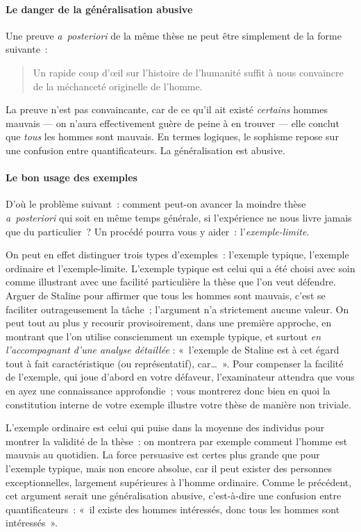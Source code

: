 \documentclass[a4paper]{article}
\begin{document}
\paragraph{Le danger de la généralisation abusive}
\label{sec-3-3-2-2}

Une preuve \emph{a posteriori} de la même thèse ne peut être simplement de la
forme suivante :

\begin{quote}
Un rapide coup d'œil sur l'histoire de l'humanité suffit à nous
convaincre de la méchanceté originelle de l'homme.
\end{quote}

La preuve n'est pas convaincante, car de ce qu'il ait existé
\emph{certains} hommes mauvais --- on n'aura effectivement guère de peine
à en trouver --- elle conclut que \emph{tous} les hommes sont mauvais. En
termes logiques, le sophisme repose sur une confusion entre
quantificateurs. La généralisation est abusive.

\paragraph{Le bon usage des exemples}
\label{sec-3-3-2-3}

D'où le problème suivant : comment peut-on avancer la moindre thèse
\emph{a posteriori} qui soit en même temps générale, si l'expérience ne
nous livre jamais que du particulier ? Un procédé pourra vous y
aider : l'\emph{exemple-limite}.

On peut en effet distinguer trois types d'exemples : l'exemple
typique, l'exemple ordinaire et l'exemple-limite. L'exemple typique
est celui qui a été choisi avec soin comme illustrant avec une
facilité particulière la thèse que l'on veut défendre. Arguer de
Staline pour affirmer que tous les hommes sont mauvais, c'est se
faciliter outrageusement la tâche ; l'argument n'a strictement aucune
valeur. On peut tout au plus y recourir provisoirement, dans une
première approche, en montrant que l'on utilise consciemment un
exemple typique, et surtout \emph{en l'accompagnant d'une analyse
détaillée} : « l'exemple de Staline est à cet égard tout à fait
caractéristique (ou représentatif), car\ldots{} ». Pour compenser la
facilité de l'exemple, qui joue d'abord en votre défaveur,
l'examinateur attendra que vous en ayez une connaissance
approfondie ; vous montrerez donc bien en quoi la constitution
interne de votre exemple illustre votre thèse de manière non
triviale.

L'exemple ordinaire est celui qui puise dans la moyenne des individus
pour montrer la validité de la thèse : on montrera par exemple
comment l'homme est mauvais au quotidien. La force persuasive est
certes plus grande que pour l'exemple typique, mais non encore
absolue, car il peut exister des personnes exceptionnelles, largement
supérieures à l'homme ordinaire. Comme le précédent, cet argument
serait une généralisation abusive, c'est-à-dire une confusion entre
quantificateurs : « il existe des hommes intéressés, donc tous les
hommes sont intéressés ».
\end{document}
